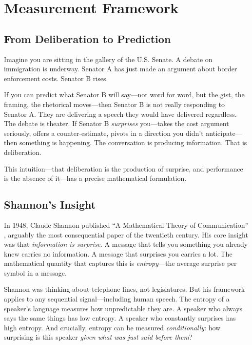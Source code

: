 \documentclass[12pt]{article}
\begin{document}
\section{Measurement Framework}

\subsection{From Deliberation to Prediction}

Imagine you are sitting in the gallery of the U.S. Senate. A debate on immigration is underway. Senator A has just made an argument about border enforcement costs. Senator B rises.

If you can predict what Senator B will say---not word for word, but the gist, the framing, the rhetorical moves---then Senator B is not really responding to Senator A. They are delivering a speech they would have delivered regardless. The debate is theater. If Senator B \textit{surprises} you---takes the cost argument seriously, offers a counter-estimate, pivots in a direction you didn't anticipate---then something is happening. The conversation is producing information. That is deliberation.

This intuition---that deliberation is the production of surprise, and performance is the absence of it---has a precise mathematical formulation.

\subsection{Shannon's Insight}

In 1948, Claude Shannon published ``A Mathematical Theory of Communication'' \citep{shannon1948}, arguably the most consequential paper of the twentieth century. His core insight was that \textit{information is surprise}. A message that tells you something you already knew carries no information. A message that surprises you carries a lot. The mathematical quantity that captures this is \textit{entropy}---the average surprise per symbol in a message.

Shannon was thinking about telephone lines, not legislatures. But his framework applies to any sequential signal---including human speech. The entropy of a speaker's language measures how unpredictable they are. A speaker who always says the same things has low entropy. A speaker who constantly surprises has high entropy. And crucially, entropy can be measured \textit{conditionally}: how surprising is this speaker \textit{given what was just said before them}?
\end{document}
